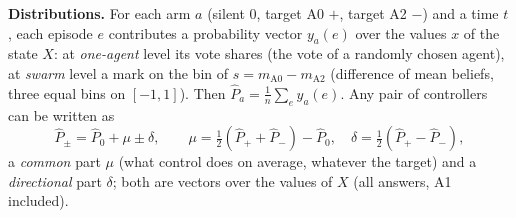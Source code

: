 \documentclass[10pt,a4paper]{article}
\begin{document}
\noindent\textbf{Distributions.} For each arm $a$ (silent $0$, target A0 $+$, target A2 $-$) and a
time $t$, each episode $e$ contributes a probability vector $y_a(e)$ over the values $x$ of the
state $X$: at \emph{one-agent} level its vote shares (the vote of a randomly chosen agent), at
\emph{swarm} level a mark on the bin of $s = m_{\text{A0}} - m_{\text{A2}}$ (difference of mean
beliefs, three equal bins on $[-1,1]$). Then $\hat P_a = \frac1n\sum_e y_a(e)$. Any pair of controllers
can be written as
\begin{equation}\label{eq:split}
\hat P_\pm = \hat P_0 + \mu \pm \delta,\qquad \mu = \tfrac12(\hat P_+ + \hat P_-) - \hat P_0,\quad
\delta = \tfrac12(\hat P_+ - \hat P_-),
\end{equation}
a \emph{common} part $\mu$ (what control does on average, whatever the target) and a
\emph{directional} part $\delta$; both are vectors over the values of $X$ (all answers, A1 included).
\end{document}
